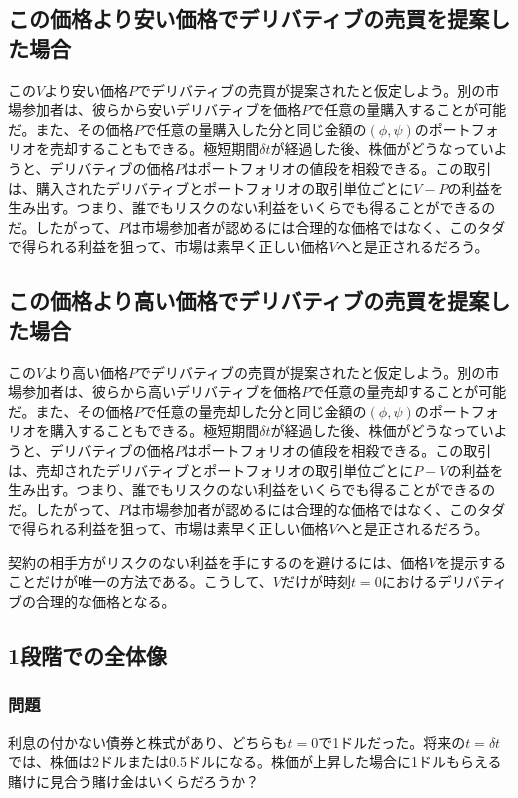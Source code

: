 \documentclass[uplatex,a4j,12pt,dvipdfmx]{jsarticle}
\begin{document}
\subsection{この価格より安い価格でデリバティブの売買を提案した場合}
この$V$より安い価格$P$でデリバティブの売買が提案されたと仮定しよう。別の市場参加者は、彼らから安いデリバティブを価格$P$で任意の量購入することが可能だ。また、その価格$P$で任意の量購入した分と同じ金額の$(\phi, \psi)$のポートフォリオを売却することもできる。極短期間$\delta t$が経過した後、株価がどうなっていようと、デリバティブの価格$P$はポートフォリオの値段を相殺できる。この取引は、購入されたデリバティブとポートフォリオの取引単位ごとに$V-P$の利益を生み出す。つまり、誰でもリスクのない利益をいくらでも得ることができるのだ。したがって、$P$は市場参加者が認めるには合理的な価格ではなく、このタダで得られる利益を狙って、市場は素早く正しい価格$V$へと是正されるだろう。

\subsection{この価格より高い価格でデリバティブの売買を提案した場合}
この$V$より高い価格$P$でデリバティブの売買が提案されたと仮定しよう。別の市場参加者は、彼らから高いデリバティブを価格$P$で任意の量売却することが可能だ。また、その価格$P$で任意の量売却した分と同じ金額の$(\phi, \psi)$のポートフォリオを購入することもできる。極短期間$\delta t$が経過した後、株価がどうなっていようと、デリバティブの価格$P$はポートフォリオの値段を相殺できる。この取引は、売却されたデリバティブとポートフォリオの取引単位ごとに$P-V$の利益を生み出す。つまり、誰でもリスクのない利益をいくらでも得ることができるのだ。したがって、$P$は市場参加者が認めるには合理的な価格ではなく、このタダで得られる利益を狙って、市場は素早く正しい価格$V$へと是正されるだろう。

契約の相手方がリスクのない利益を手にするのを避けるには、価格$V$を提示することだけが唯一の方法である。こうして、$V$だけが時刻$t=0$におけるデリバティブの合理的な価格となる。

\subsection{1段階での全体像}
\subsubsection{問題}
利息の付かない債券と株式があり、どちらも$t=0$で1ドルだった。将来の$t=\delta t$では、株価は2ドルまたは0.5ドルになる。株価が上昇した場合に1ドルもらえる賭けに見合う賭け金はいくらだろうか？
\end{document}
